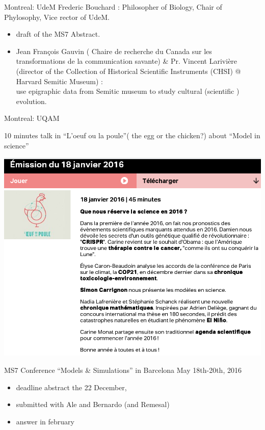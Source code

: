 \documentclass[9pt, handout=show,notes=show]{beamer}
\begin{document}
\begin{frame}{Montreal: UdeM}
Frederic Bouchard : Philosopher of Biology, Chair of Phylosophy, Vice rector of UdeM.
    \begin{itemize}
	\item draft of the MS7 Abstract.
	\item Jean François Gauvin ( Chaire de recherche du Canada sur les transformations de la communication savante) \&   Pr. Vincent Larivière (director of the Collection of Historical Scientific Instruments (CHSI) @ Harvard Semitic Museum) :\\
	    use epigraphic data from Semitic museum to study cultural (scientific ) evolution.
    \end{itemize}

    
\end{frame}

\begin{frame}{Montreal: UQAM}

    10 minutes talk in ``L'oeuf ou la poule''( the egg or the chicken?) about ``Model in science''
    \begin{center}
	\includegraphics[width=.8\textwidth]{images/lolp.png}
    \end{center}

\end{frame}

\begin{frame}{MS7}
    Conference ``Models \& Simulations'' in Barcelona May 18th-20th, 2016\\
    \begin{itemize}
	\item deadline abstract the 22 December,
	    \vfil
	\item submitted with Ale and Bernardo (and Remesal)
	    \vfil
	\item answer in february
	    \vfil
    \end{itemize}
\end{frame}
\end{document}
